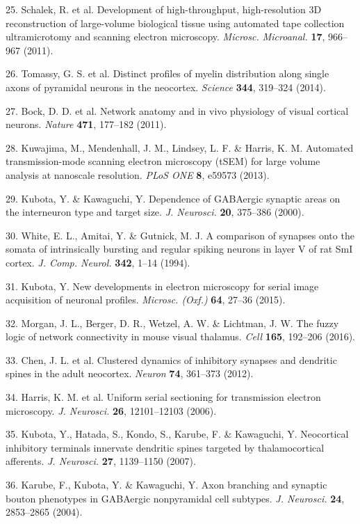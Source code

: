 \documentclass{article}
\begin{document}
\begin{hangpars}
25. Schalek, R. et al. Development of high-throughput, high-resolution 3D reconstruction of large-volume biological tissue using automated tape collection ultramicrotomy and scanning electron microscopy. \emph{Microsc. Microanal.} \textbf{17}, 966–967 (2011).

26. Tomassy, G. S. et al. Distinct profiles of myelin distribution along single axons of pyramidal neurons in the neocortex. \emph{Science} \textbf{344}, 319–324 (2014).

27. Bock, D. D. et al. Network anatomy and in vivo physiology of visual cortical neurons. \emph{Nature} \textbf{471}, 177–182 (2011).

28. Kuwajima, M., Mendenhall, J. M., Lindsey, L. F. \& Harris, K. M. Automated transmission-mode scanning electron microscopy (tSEM) for large volume analysis at nanoscale resolution. \emph{PLoS ONE} \textbf{8}, e59573 (2013).

29. Kubota, Y. \& Kawaguchi, Y. Dependence of GABAergic synaptic areas on the interneuron type and target size. \emph{J. Neurosci.} \textbf{20}, 375–386 (2000).

30. White, E. L., Amitai, Y. \& Gutnick, M. J. A comparison of synapses onto the somata of intrinsically bursting and regular spiking neurons in layer V of rat SmI cortex. \emph{J. Comp. Neurol.} \textbf{342}, 1–14 (1994).

31. Kubota, Y. New developments in electron microscopy for serial image acquisition of neuronal profiles. \emph{Microsc. (Oxf.)} \textbf{64}, 27–36 (2015).

32. Morgan, J. L., Berger, D. R., Wetzel, A. W. \& Lichtman, J. W. The fuzzy logic of network connectivity in mouse visual thalamus. \emph{Cell} \textbf{165}, 192–206 (2016).

33. Chen, J. L. et al. Clustered dynamics of inhibitory synapses and dendritic spines in the adult neocortex. \emph{Neuron} \textbf{74}, 361–373 (2012).

34. Harris, K. M. et al. Uniform serial sectioning for transmission electron microscopy. \emph{J. Neurosci.} \textbf{26}, 12101–12103 (2006).

35. Kubota, Y., Hatada, S., Kondo, S., Karube, F. \& Kawaguchi, Y. Neocortical inhibitory terminals innervate dendritic spines targeted by thalamocortical afferents. \emph{J. Neurosci.} \textbf{27}, 1139–1150 (2007).

36. Karube, F., Kubota, Y. \& Kawaguchi, Y. Axon branching and synaptic bouton phenotypes in GABAergic nonpyramidal cell subtypes. \emph{J. Neurosci.} \textbf{24}, 2853–2865 (2004).


\end{hangpars}
\end{document}
